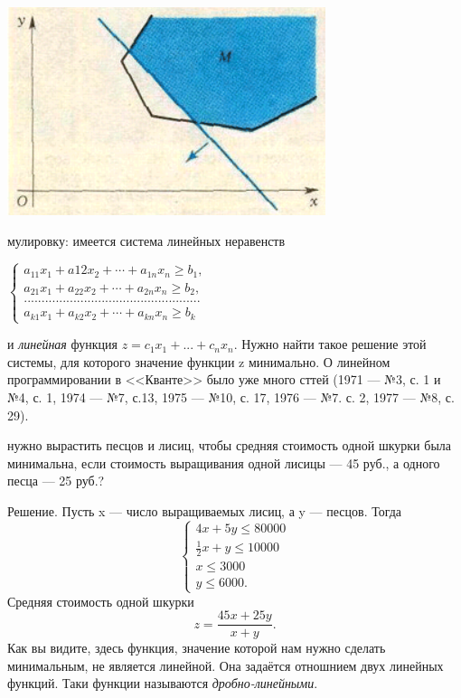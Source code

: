 \documentclass{article}
\begin{document}
\begin{multicols}{2}
\begin{flushleft}
    \includegraphics[scale=0.8]{./images/graphic2.png}
\end{flushleft}
\begin{scriptsize}
    мулировку: имеется система линейных неравенств
    
    \begin{math}
        \begin{cases}
            a_{11}x_1+a{12}x_2+\cdots+a_{1n}x_n\geq b_1,
            \\
            a_{21}x_1+a_{22}x_2+\cdots+a_{2n}x_n \geq b_2,
            \\
            . . . . . . . . . . . . . . . . . . . . . . . . . . . . . . . . . . . . . . . . . . . . . . . . . . 
            \\
            a_{k1}x_1+a_{k2}x_2+\cdots+a_{kn}x_n \geq b_k
        \end{cases}
    \end{math}
    
    \noindent
    и \textit{линейная} функция $z=c_1x_1+...+c_nx_n$. Нужно найти такое решение этой системы, для которого значение функции z минимально. О линейном программировании в <<Кванте>> было уже много сттей (1971 --- №3, с. 1 и №4, с. 1, 1974 --- №7, с.13, 1975 --- №10, с. 17, 1976 --- №7. с. 2, 1977 --- №8, с. 29).
\end{scriptsize}
нужно вырастить песцов и лисиц, чтобы средняя стоимость одной шкурки была минимальна, если стоимость выращивания одной лисицы --- 45 руб., а одного песца --- 25 руб.? \par
Решение. Пусть  x --- число выращиваемых лисиц, а y --- песцов. Тогда
\begin{equation}
    \begin{cases}
        4x+5y\leq80000
        \\
        \frac{1}{2}x+y\leq10000
        \\
        x\leq3000
        \\
        y\leq6000.
    \end{cases}
\end{equation}
Средняя стоимость одной шкурки
\[z=\frac{45x+25y}{x+y}.\]
Как вы видите, здесь функция, значение которой нам нужно сделать минимальным, не является линейной. Она задаётся отношнием двух линейных функций. Таки функции называются \textit{дробно-линейными}.
\end{multicols}
\fancyfoot{}
\pagestyle{empty}
\setcounter{page}{13}
\end{document}
